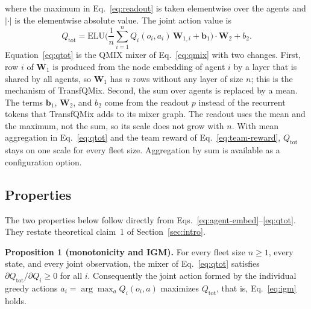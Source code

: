 where the maximum in Eq.~\eqref{eq:readout} is taken elementwise over the agents and
$|\cdot|$ is the elementwise absolute value. The joint action value is
\begin{equation}
\label{eq:qtot}
Q_{\text{tot}} = \mathrm{ELU}\Big(\frac{1}{n}\sum_{i=1}^{n} Q_i(o_i,a_i)\,\mathbf{W}_{1,i} + \mathbf{b}_1\Big)\cdot\mathbf{W}_2 + b_2 .
\end{equation}
Equation~\eqref{eq:qtot} is the QMIX mixer of Eq.~\eqref{eq:qmix} with two changes. First,
row $i$ of $\mathbf{W}_1$ is produced from the node embedding of agent $i$ by a layer that
is shared by all agents, so $\mathbf{W}_1$ has $n$ rows without any layer of size $n$; this
is the mechanism of TransfQMix. Second, the sum over agents is replaced by a mean. The
terms $\mathbf{b}_1$, $\mathbf{W}_2$, and $b_2$ come from the readout $p$ instead of the
recurrent tokens that TransfQMix adds to its mixer graph. The readout uses the mean and the
maximum, not the sum, so its scale does not grow with $n$. With mean aggregation in
Eq.~\eqref{eq:qtot} and the team reward of Eq.~\eqref{eq:team-reward}, $Q_{\text{tot}}$
stays on one scale for every fleet size. Aggregation by sum is available as a configuration
option.

\subsection{Properties}
\label{subsec:properties}
The two properties below follow directly from Eqs.~\eqref{eq:agent-embed}--\eqref{eq:qtot}.
They restate theoretical claim~1 of Section~\ref{sec:intro}.

\textbf{Proposition 1 (monotonicity and IGM).}
For every fleet size $n\ge 1$, every state, and every joint observation, the mixer of
Eq.~\eqref{eq:qtot} satisfies $\partial Q_{\text{tot}}/\partial Q_i \ge 0$ for all $i$.
Consequently the joint action formed by the individual greedy actions
$a_i = \arg\max_{a}Q_i(o_i,a)$ maximizes $Q_{\text{tot}}$, that is, Eq.~\eqref{eq:igm} holds.

